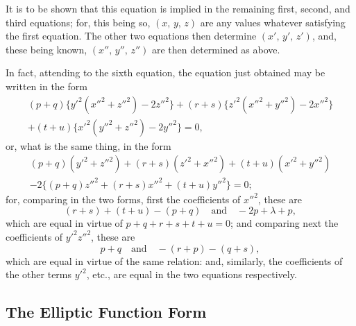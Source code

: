 \documentclass[11pt,a4paper]{article}
\theoremstyle{cayley}
\begin{document}
It is to be shown that this equation is implied in the remaining first, second, and third equations; for, this being so, $(x,\, y,\, z)$ are any values whatever satisfying the first equation. The other two equations then determine $(x',\, y',\, z')$, and, these being known, $(x'',\, y'',\, z'')$ are then determined as above.

In fact, attending to the sixth equation, the equation just obtained may be written in the form
\begin{multline*}
(p+q)\{y'^{2}(x''^{2} + z''^{2}) - 2z''^{2}\} + (r+s)\{z'^{2}(x''^{2} + y''^{2}) - 2x''^{2}\} \\
+ (t+u)\{x'^{2}(y''^{2} + z''^{2}) - 2y''^{2}\} = 0,
\end{multline*}
or, what is the same thing, in the form
\begin{multline*}
(p+q)(y'^{2} + z''^{2}) + (r+s)(z'^{2} + x''^{2}) + (t+u)(x'^{2} + y''^{2}) \\
- 2\{(p+q)z''^{2} + (r+s)x''^{2} + (t+u)y''^{2}\} = 0;
\end{multline*}
for, comparing in the two forms, first the coefficients of $x''^{2}$, these are
\[
(r+s) + (t+u) - (p+q)\quad \text{and}\quad -2p + \lambda + p,
\]
which are equal in virtue of $p+q+r+s+t+u=0$; and comparing next the coefficients of $y'^{2}z''^{2}$, these are
\[
p+q\quad \text{and}\quad -(r+p) - (q+s),
\]
which are equal in virtue of the same relation: and, similarly, the coefficients of the other terms $y'^{2}$, etc., are equal in the two equations respectively.

\subsection*{The Elliptic Function Form}
\end{document}
